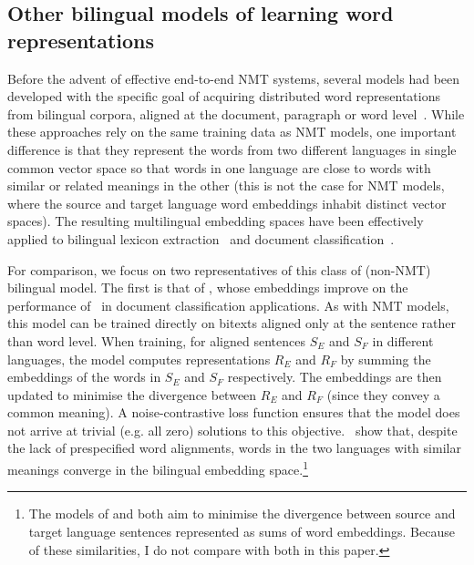 \subsection{Other bilingual models of learning word representations}
Before the advent of effective end-to-end NMT systems, several models had been developed with the specific goal of acquiring distributed word representations from bilingual corpora, aligned at the document, paragraph or word level~\citep{Haghighi2008Learning,vulic2011identifying,mikolov2013exploiting,Hermann:2014:ICLR,lauly2014autoencoder}. While these approaches rely on the same training data as NMT models, one important difference is that they represent the words from two different languages in single common vector space so that words in one language are close to words with similar or related meanings in the other (this is not the case for NMT models, where the source and target language word embeddings inhabit distinct vector spaces). The resulting multilingual embedding spaces have been effectively applied to bilingual lexicon extraction~\citep{Haghighi2008Learning,vulic2011identifying,mikolov2013exploiting} and document classification~\citep{Klementiev,Hermann:2014:ICLR,lauly2014autoencoder,Kocisky:2014}.

For comparison, we focus on two representatives of this class of (non-NMT) bilingual model. The first is that of \cite{Hermann:2014:ICLR}, whose embeddings improve on the performance of~\cite{Klementiev} in document classification applications. As with NMT models, this model can be trained directly on bitexts aligned only at the sentence rather than word level. When training, for aligned sentences \(S_E\) and \(S_F\) in different languages, the model computes representations \(R_E\) and \(R_F\) by summing the embeddings of the words in \(S_E\) and \(S_F\) respectively. The embeddings are then updated to minimise the divergence between \(R_E\) and \(R_F\) (since they convey a common meaning). A noise-contrastive loss function ensures that the model does not arrive at trivial (e.g. all zero) solutions to this objective.~\cite{Hermann:2014:ICLR} show that, despite the lack of prespecified word alignments, words in the two languages with similar meanings converge in the bilingual embedding space.\footnote{The models of \cite{lauly2014autoencoder} and \cite{Hermann:2014:ICLR} both aim to minimise the divergence between source and target language sentences represented as sums of word embeddings. Because of these similarities, I do not compare with both in this paper.}

